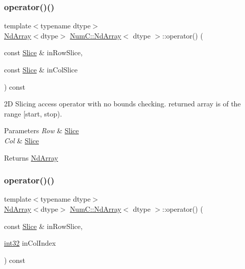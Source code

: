 \subsubsection{\texorpdfstring{operator()()}{operator()()}\hspace{0.1cm}{\footnotesize\ttfamily [3/5]}}
{\footnotesize\ttfamily template$<$typename dtype$>$ \\
\mbox{\hyperlink{class_num_c_1_1_nd_array}{Nd\+Array}}$<$dtype$>$ \mbox{\hyperlink{class_num_c_1_1_nd_array}{Num\+C\+::\+Nd\+Array}}$<$ dtype $>$\+::operator() (\begin{DoxyParamCaption}\item[{const \mbox{\hyperlink{class_num_c_1_1_slice}{Slice}} \&}]{in\+Row\+Slice,  }\item[{const \mbox{\hyperlink{class_num_c_1_1_slice}{Slice}} \&}]{in\+Col\+Slice }\end{DoxyParamCaption}) const\hspace{0.3cm}{\ttfamily [inline]}}

2D Slicing access operator with no bounds checking. returned array is of the range \mbox{[}start, stop).


\begin{DoxyParams}{Parameters}
{\em Row} & \mbox{\hyperlink{class_num_c_1_1_slice}{Slice}} \\
\hline
{\em Col} & \mbox{\hyperlink{class_num_c_1_1_slice}{Slice}} \\
\hline
\end{DoxyParams}
\begin{DoxyReturn}{Returns}
\mbox{\hyperlink{class_num_c_1_1_nd_array}{Nd\+Array}} 
\end{DoxyReturn}
\mbox{\label{class_num_c_1_1_nd_array_abc89e90ee2777842c911f640c8d86228}} 
\subsubsection{\texorpdfstring{operator()()}{operator()()}\hspace{0.1cm}{\footnotesize\ttfamily [4/5]}}
{\footnotesize\ttfamily template$<$typename dtype$>$ \\
\mbox{\hyperlink{class_num_c_1_1_nd_array}{Nd\+Array}}$<$dtype$>$ \mbox{\hyperlink{class_num_c_1_1_nd_array}{Num\+C\+::\+Nd\+Array}}$<$ dtype $>$\+::operator() (\begin{DoxyParamCaption}\item[{const \mbox{\hyperlink{class_num_c_1_1_slice}{Slice}} \&}]{in\+Row\+Slice,  }\item[{\mbox{\hyperlink{namespace_num_c_aa5a7e69266097d55816d4cdb19542b53}{int32}}}]{in\+Col\+Index }\end{DoxyParamCaption}) const\hspace{0.3cm}{\ttfamily [inline]}}

